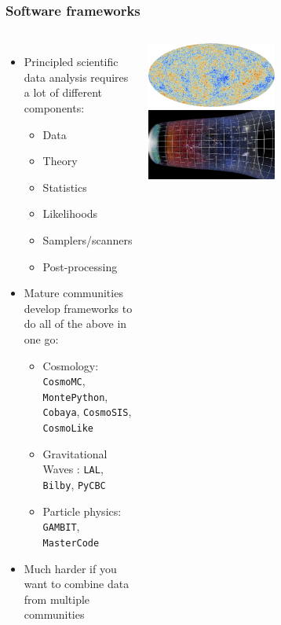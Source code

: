 \documentclass[aspectratio=169]{beamer}
\begin{document}
\begin{frame}
    \frametitle{Software frameworks}
    \begin{columns}
        \begin{itemize}
            \item Principled scientific data analysis requires a lot of different components:
                \begin{itemize}
                    \item Data
                    \item Theory
                    \item Statistics
                    \item Likelihoods
                    \item Samplers/scanners
                    \item Post-processing
                \end{itemize}
            \item Mature communities develop frameworks to do all of the above in one go:
                \begin{itemize}
                    \item Cosmology: \texttt{CosmoMC}, \texttt{MontePython}, \texttt{Cobaya}, \texttt{CosmoSIS}, \texttt{CosmoLike}
                    \item Gravitational Waves : \texttt{LAL}, \texttt{Bilby}, \texttt{PyCBC}
                    \item Particle physics: \texttt{GAMBIT}, \texttt{MasterCode}
                \end{itemize}
            \item Much harder if you want to combine data from multiple communities
        \end{itemize}
        \includegraphics[width=0.5\textwidth]{figures/cmb}%
        \includegraphics[width=0.5\textwidth]{figures/theory}

\end{columns}
\end{frame}
\end{document}
